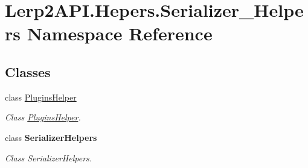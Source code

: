 \hypertarget{namespace_lerp2_a_p_i_1_1_hepers_1_1_serializer___helpers}{}\section{Lerp2\+A\+P\+I.\+Hepers.\+Serializer\+\_\+\+Helpers Namespace Reference}
\label{namespace_lerp2_a_p_i_1_1_hepers_1_1_serializer___helpers}
\subsection*{Classes}
\begin{DoxyCompactItemize}
\item 
class \hyperlink{class_lerp2_a_p_i_1_1_hepers_1_1_serializer___helpers_1_1_plugins_helper}{Plugins\+Helper}
\begin{DoxyCompactList}\small\item\em Class \hyperlink{class_lerp2_a_p_i_1_1_hepers_1_1_serializer___helpers_1_1_plugins_helper}{Plugins\+Helper}. \end{DoxyCompactList}\item 
class {\bfseries Serializer\+Helpers}
\begin{DoxyCompactList}\small\item\em Class Serializer\+Helpers. \end{DoxyCompactList}\end{DoxyCompactItemize}
